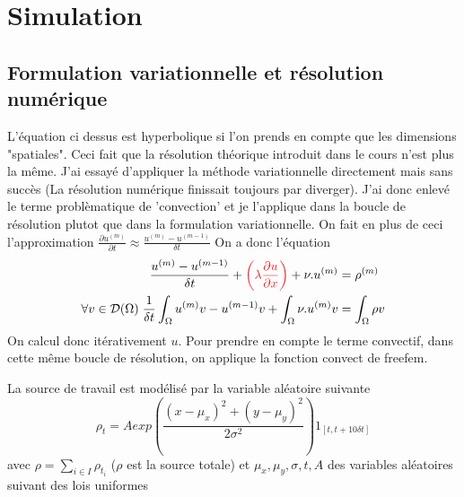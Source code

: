 \documentclass[french]{article}
\begin{document}
    
    \section{Simulation}
    \subsection{Formulation variationnelle et résolution numérique}
    L'équation ci dessus est hyperbolique si l'on prends en compte que les dimensions "spatiales".
    Ceci fait que la résolution théorique introduit dans le cours n'est plus la même. J'ai essayé d'appliquer la méthode
    variationnelle directement mais sans succès (La résolution numérique finissait toujours par diverger). J'ai donc enlevé le terme problèmatique
    de 'convection' et je l'applique dans la boucle de résolution plutot que dans la formulation variationnelle. On fait en plus de ceci l'approximation 
    $\frac{\partial u^{(m)}}{\partial t} \approx \frac{u^{(m)} - u^{(m-1)}}{\delta t}$ On a donc l'équation
    \begin{alignat*}{10}
        \frac{u^{(m)} - u^{(m-1)}}{\delta t} + 
        \textcolor{Red}{\left( \lambda\frac{\partial u}{\partial x}\right)} 
        + \nu.u^{(m)} &= \rho^{(m)} \\
        \forall v \in \mathcal{D}(\Omega) \; \frac{1}{\delta t} \int_{\Omega} u^{(m)}v - u^{(m-1)}v + \int_{\Omega} \nu.u^{(m)}v
        &= \int_{\Omega} \rho v
    \end{alignat*}
    On calcul donc itérativement $u$. Pour prendre en compte le terme convectif, dans cette même boucle de résolution, on applique la fonction convect de freefem.
    
    La source de travail est modélisé par la variable aléatoire suivante 
    \begin{equation}
        \rho_t = Aexp\left( \frac{(x-\mu_x)^2+(y-\mu_y)^2}{2\sigma^2} \right)1_{[t, t+10\delta t]}
    \end{equation} 
    avec $\rho = \sum_{i\in I} \rho_{t_i}$ ($\rho$ est la source totale) et $\mu_x,\mu_y,\sigma,t,A$ des variables aléatoires suivant des lois uniformes
\end{document}
